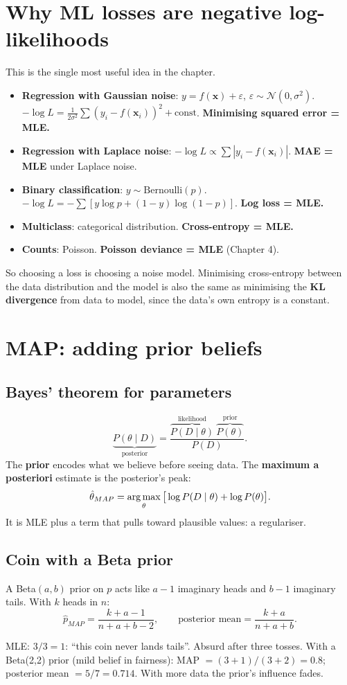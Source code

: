 \section{Why ML losses are negative log-likelihoods}
This is the single most useful idea in the chapter.
\begin{itemize}
\item \textbf{Regression with Gaussian noise}: $y = f(\mathbf x) + \varepsilon$, $\varepsilon\sim\mathcal N(0,\sigma^2)$.
  $-\log L = \frac{1}{2\sigma^2}\sum(y_i - f(\mathbf x_i))^2 + \text{const}$. \textbf{Minimising squared error = MLE.}
\item \textbf{Regression with Laplace noise}: $-\log L\propto\sum|y_i - f(\mathbf x_i)|$. \textbf{MAE = MLE} under Laplace noise.
\item \textbf{Binary classification}: $y\sim\text{Bernoulli}(p)$. $-\log L = -\sum[y\log p + (1-y)\log(1-p)]$.
  \textbf{Log loss = MLE.}
\item \textbf{Multiclass}: categorical distribution. \textbf{Cross-entropy = MLE.}
\item \textbf{Counts}: Poisson. \textbf{Poisson deviance = MLE} (Chapter 4).
\end{itemize}
So choosing a loss is choosing a noise model. Minimising cross-entropy between the data distribution and the model is also the same as
minimising the \textbf{KL divergence} from data to model, since the data's own entropy is a constant.

\section{MAP: adding prior beliefs}
\subsection{Bayes' theorem for parameters}
\[ \underbrace{P(\theta\mid D)}_{\text{posterior}} = \frac{\overbrace{P(D\mid\theta)}^{\text{likelihood}}\ \overbrace{P(\theta)}^{\text{prior}}}{P(D)}. \]
The \textbf{prior} encodes what we believe before seeing data. The \textbf{maximum a posteriori} estimate is the posterior's peak:
\[ \hat\theta_{MAP} = \operatorname*{arg\,max}_\theta\big[\log P(D\mid\theta) + \log P(\theta)\big]. \]
It is MLE plus a term that pulls toward plausible values: a regulariser.

\subsection{Coin with a Beta prior}
A Beta$(a, b)$ prior on $p$ acts like $a - 1$ imaginary heads and $b - 1$ imaginary tails. With $k$ heads in $n$:
\[ \hat p_{MAP} = \frac{k + a - 1}{n + a + b - 2},\qquad \text{posterior mean} = \frac{k + a}{n + a + b}. \]
\begin{example}
MLE: $3/3 = 1$: ``this coin never lands tails''. Absurd after three tosses. With a Beta(2,2) prior (mild belief in fairness):
MAP $= (3+1)/(3+2) = 0.8$; posterior mean $= 5/7 = 0.714$. With more data the prior's influence fades.
\end{example}

